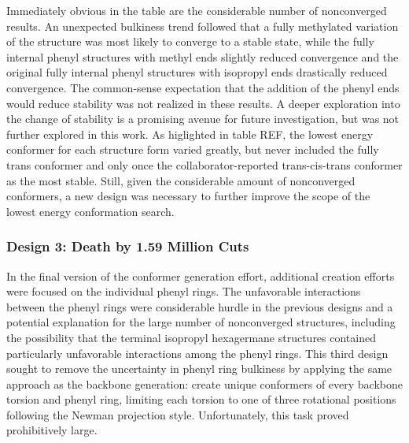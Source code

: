
Immediately obvious in the table are the considerable number of nonconverged results. 
An unexpected bulkiness trend followed that a fully methylated variation of the structure was most likely to converge to a stable state, while the fully internal phenyl structures with methyl ends slightly reduced convergence and the original fully internal phenyl structures with isopropyl ends drastically reduced convergence.
The common-sense expectation that the addition of the phenyl ends would reduce stability was not realized in these results. 
A deeper exploration into the change of stability is a promising avenue for future investigation, but was not further explored in this work.
As
higlighted
in table 
%
REF,
%
the lowest energy conformer for each structure form varied greatly, but never included the fully trans conformer and only once the collaborator-reported trans-cis-trans conformer as the most stable.
Still, given the considerable amount of nonconverged conformers, a new design was necessary to further improve the scope of the lowest energy conformation search.

\subsubsection{Design 3: Death by 1.59 Million Cuts}

In the final version of the conformer generation effort, additional creation efforts were focused on the individual phenyl rings. 
The unfavorable interactions between the phenyl rings were considerable hurdle in the previous designs and a potential explanation for the large number of nonconverged structures, including the possibility that the terminal isopropyl hexagermane structures contained particularly unfavorable interactions among the phenyl rings.
This third design sought to remove the uncertainty in phenyl ring bulkiness by applying the same approach as the backbone generation: create unique conformers of every backbone torsion and phenyl ring, limiting each torsion to one of three rotational positions following the Newman projection style. 
Unfortunately, this task proved prohibitively large.

